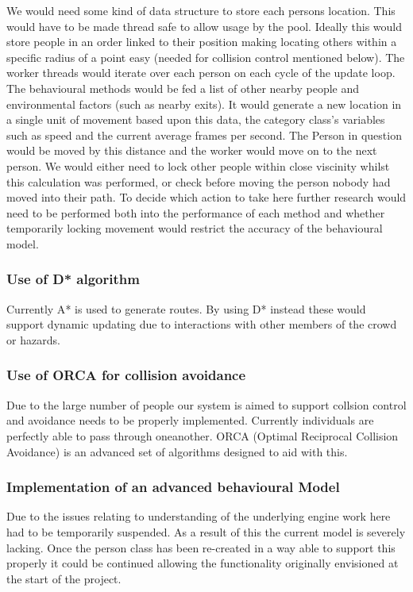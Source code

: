 We would need some kind of data structure to store each persons location.
This would have to be made thread safe to allow usage by the pool.
Ideally this would store people in an order linked to their position
making locating others within a specific radius of a point easy (needed
for collision control mentioned below). The worker threads would iterate
over each person on each cycle of the update loop. The behavioural
methods would be fed a list of other nearby people and environmental
factors (such as nearby exits). It would generate a new location in
a single unit of movement based upon this data, the category class's
variables such as speed and the current average frames per second.
The Person in question would be moved by this distance and the worker
would move on to the next person. We would either need to lock other
people within close viscinity whilst this calculation was performed,
or check before moving the person nobody had moved into their path.
To decide which action to take here further research would need to
be performed both into the performance of each method and whether
temporarily locking movement would restrict the accuracy of the behavioural
model.


\subsubsection*{Use of D{*} algorithm}

Currently A{*} is used to generate routes. By using D{*} instead these
would support dynamic updating due to interactions with other members
of the crowd or hazards.


\subsubsection*{Use of ORCA for collision avoidance}

Due to the large number of people our system is aimed to support collsion
control and avoidance needs to be properly implemented. Currently
individuals are perfectly able to pass through oneanother. ORCA (Optimal
Reciprocal Collision Avoidance) is an advanced set of algorithms designed
to aid with this.


\subsubsection*{Implementation of an advanced behavioural Model}

Due to the issues relating to understanding of the underlying engine
work here had to be temporarily suspended. As a result of this the
current model is severely lacking. Once the person class has been
re-created in a way able to support this properly it could be continued
allowing the functionality originally envisioned at the start of the
project.


